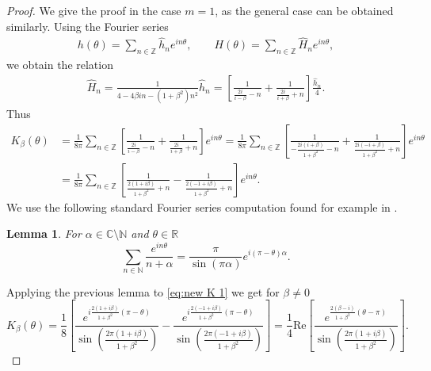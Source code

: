 \documentclass[10pt]{article}
\newtheorem{lemma}[theorem]{Lemma}
\theoremstyle{definition}
\theoremstyle{remark}
\numberwithin{equation}{section}
\renewcommand{\Re}{\mathrm{Re}}
\newcommand{\0}{\emptyset}
\newcommand{\bt}{\beta}
\newcommand{\tht}{\theta}
\newcommand{\bbZ}{\mathbb Z}
\begin{document}
	\begin{proof}
 We give the proof in the case $m = 1$, as the general case can be obtained similarly. 
		Using the Fourier series \begin{equation*}
			\begin{split}
				h(\tht) = \sum_{n\in\bbZ} \hat{h}_n e^{in\tht},\qquad H(\tht) = \sum_{n\in\bbZ} \hat{H}_n e^{in\tht}, 
			\end{split}
		\end{equation*} we obtain the relation \begin{equation}\label{eq:elliptic-Fourier}
			\begin{split}
				\hat{H}_n = \frac{1}{4-4\bt in - (1+\beta^2)n^2} \hat{h}_n= \left[  \frac{1}{ \frac{2i}{i-\beta}- n } + \frac{1}{\frac{2i}{i+\beta} + n}  \right] \frac{\hat{h}_n}{4}.
			\end{split}
		\end{equation} 
			Thus
			\begin{align}\label{eq:new K 1}
				K_{\beta}(\theta)&=\frac{1}{8\pi}  \sum_{n\in\bbZ}  \left[  \frac{1}{ \frac{2i}{i-\beta}- n } + \frac{1}{\frac{2i}{i+\beta} + n}  \right] e^{in\tht }=\frac{1}{8\pi}  \sum_{n\in\bbZ}  \left[  \frac{1}{- \frac{2i(i+\beta)}{1+\beta^2}- n } + \frac{1}{\frac{2i(-i+\beta)}{1+\beta^2} + n}  \right] e^{in\tht }\nonumber\\
				&=\frac{1}{8\pi}  \sum_{n\in\bbZ} \left[\frac{1}{\frac{2(1+i\beta)}{1+\beta^2} + n} - \frac{1}{ \frac{2(-1+i\beta)}{1+\beta^2}+ n }   \right] e^{in\tht }.
			\end{align}
			We use the following standard Fourier series computation found for example in \cite{stein2003princeton}.
			\begin{lemma}\label{lem:FS}
				For $\alpha \in \mathbb{C}\setminus \mathbb{N}$ and $\theta \in \mathbb{R}$
				\[
				\sum_{n\in \mathbb{N}}\frac{e^{in\theta}}{n+\alpha}=\frac{\pi}{\sin(\pi\alpha)}e^{i(\pi-\theta)\alpha}.
				\]
			\end{lemma}
			\noindent Applying the previous lemma to \eqref{eq:new K 1} we get for $\beta\neq 0$
			\begin{equation}\label{eq:cln K}
				K_{\beta}(\theta)=\frac{1}{8}\left[\frac{e^{i\frac{2(1+i\beta)}{1+\beta^2}(\pi-\theta)}}{\sin\left(\frac{2\pi(1+i\beta)}{1+\beta^2}\right)}-\frac{e^{i\frac{2(-1+i\beta)}{1+\beta^2}(\pi-\theta)}}{\sin\left(\frac{2\pi(-1+i\beta)}{1+\beta^2}\right)}\right]=\frac{1}{4}\Re \left[\frac{e^{\frac{2(\beta-i)}{1+\beta^2}(\theta-\pi)}}{\sin\left(\frac{2\pi(1+i\beta)}{1+\beta^2}\right)}\right].
				\end{equation}
  

\end{proof}
\end{document}
